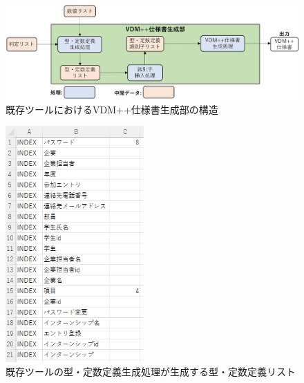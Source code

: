 \begin{figure}[tp]
    \begin{center}
        \includegraphics[width=1.0\columnwidth]{image/exis_generator_structure.png}
        \caption{既存ツールにおけるVDM++仕様書生成部の構造}
        \label{fig:exis_generator_structure}
    \end{center}
\end{figure}

\begin{figure}[tp]
    \begin{center}
        \includegraphics[width=200]{image/exis_katateisu_list.png}
        \caption{既存ツールの型・定数定義生成処理が生成する型・定数定義リスト}
        \label{fig:exis_katateisu_list}
    \end{center}
\end{figure}


